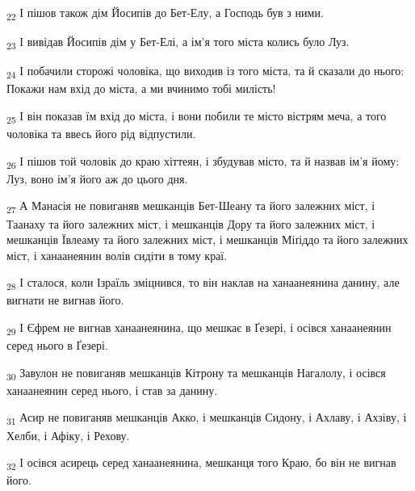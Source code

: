 \begin{tcolorbox}
\textsubscript{22} І пішов також дім Йосипів до Бет-Елу, а Господь був з ними.
\end{tcolorbox}
\begin{tcolorbox}
\textsubscript{23} І вивідав Йосипів дім у Бет-Елі, а ім'я того міста колись було Луз.
\end{tcolorbox}
\begin{tcolorbox}
\textsubscript{24} І побачили сторожі чоловіка, що виходив із того міста, та й сказали до нього: Покажи нам вхід до міста, а ми вчинимо тобі милість!
\end{tcolorbox}
\begin{tcolorbox}
\textsubscript{25} І він показав їм вхід до міста, і вони побили те місто вістрям меча, а того чоловіка та ввесь його рід відпустили.
\end{tcolorbox}
\begin{tcolorbox}
\textsubscript{26} І пішов той чоловік до краю хіттеян, і збудував місто, та й назвав ім'я йому: Луз, воно ім'я його аж до цього дня.
\end{tcolorbox}
\begin{tcolorbox}
\textsubscript{27} А Манасія не повиганяв мешканців Бет-Шеану та його залежних міст, і Таанаху та його залежних міст, і мешканців Дору та його залежних міст, і мешканців Ївлеаму та його залежних міст, і мешканців Міґіддо та його залежних міст, і ханаанеянин волів сидіти в тому краї.
\end{tcolorbox}
\begin{tcolorbox}
\textsubscript{28} І сталося, коли Ізраїль зміцнився, то він наклав на ханаанеянина данину, але вигнати не вигнав його.
\end{tcolorbox}
\begin{tcolorbox}
\textsubscript{29} І Єфрем не вигнав ханаанеянина, що мешкає в Ґезері, і осівся ханаанеянин серед нього в Ґезері.
\end{tcolorbox}
\begin{tcolorbox}
\textsubscript{30} Завулон не повиганяв мешканців Кітрону та мешканців Нагалолу, і осівся ханаанеянин серед нього, і став за данину.
\end{tcolorbox}
\begin{tcolorbox}
\textsubscript{31} Асир не повиганяв мешканців Акко, і мешканців Сидону, і Ахлаву, і Ахзіву, і Хелби, і Афіку, і Рехову.
\end{tcolorbox}
\begin{tcolorbox}
\textsubscript{32} І осівся асирець серед ханаанеянина, мешканця того Краю, бо він не вигнав його.
\end{tcolorbox}
